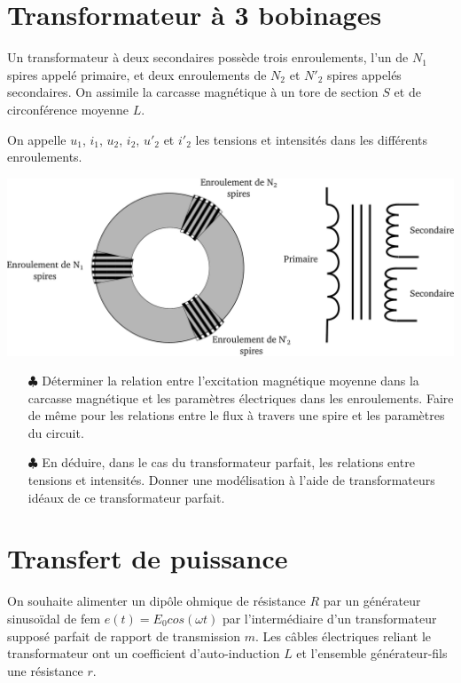 \documentclass{report}
\begin{document}
\newpage

\section*{Transformateur à 3 bobinages}

Un transformateur à deux secondaires  possède trois enroulements, l'un de $N_{1}$ spires appelé primaire, et deux enroulements de $N_{2}$ et $N'_{2}$ spires appelés secondaires. On assimile la carcasse magnétique à un tore de section $S$ et de circonférence moyenne $L$.

On appelle $u_{1}$, $i_{1}$, $u_{2}$, $i_{2}$, $u'_{2}$ et $i'_{2}$ les tensions et intensités dans les différents enroulements.
\begin{center}
	\includegraphics[scale=0.3]{transfo_3.pdf}
\end{center}

\begin{itemize}
	\item[$\clubsuit$] Déterminer la relation entre l'excitation magnétique moyenne dans la carcasse magnétique et les paramètres électriques dans les enroulements. Faire de même pour les relations entre le flux à travers une spire et les paramètres du circuit.
	
	\item[$\clubsuit$] En déduire, dans le cas du transformateur parfait, les relations entre tensions et intensités. Donner une modélisation à l'aide de transformateurs idéaux de ce transformateur parfait.	
\end{itemize}

\section*{Transfert de puissance}

On souhaite alimenter un dipôle ohmique de résistance $R$ par un générateur sinusoïdal de fem $e(t) = E_{0} cos(\omega t)$ par l'intermédiaire d'un transformateur supposé parfait de rapport de transmission $m$. Les câbles électriques reliant le transformateur ont un coefficient d'auto-induction $L$ et l'ensemble générateur-fils une résistance $r$.
\end{document}
